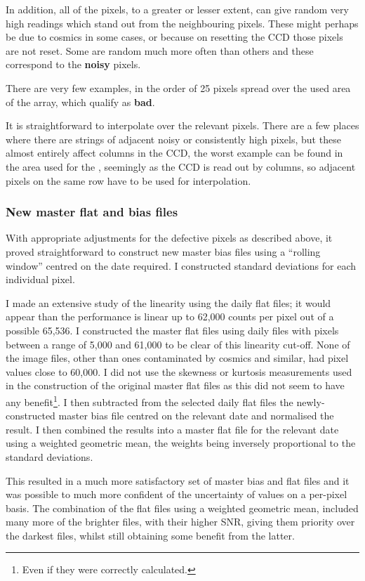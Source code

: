 In addition, all of the pixels, to a greater or lesser extent, can give random
very high readings which stand out from the neighbouring pixels. These might
perhaps be due to cosmics in some cases, or because on resetting the CCD those
pixels are not reset. Some are random much more often than others and these
correspond to the \textbf{noisy} pixels.

There are very few examples, in the order of 25 pixels spread over the used area
of the array, which qualify as \textbf{bad}.

It is straightforward to interpolate over the relevant pixels. There are a few places where there are strings of
adjacent noisy or consistently high pixels, but these almost entirely affect
columns in the CCD, the worst example can be found in the area used for the \gfilter, seemingly as
the CCD is read out by columns, so adjacent pixels on the same row have to be
used for interpolation.

\subsubsection{New master flat and bias files}
\protect\label{section:newmastfb}

With appropriate adjustments for the defective pixels as described above, it
proved straightforward to construct new master bias files using a  ``rolling
window'' centred on the date required. I constructed standard deviations for each individual pixel.

I made an extensive study of the linearity using the daily flat
files; it would  appear than the performance is linear up to 62,000 counts per
pixel out of a possible 65,536. I constructed the master
flat files using daily files with pixels between a range of 5,000 and 61,000 to be clear of this linearity cut-off.
None of the image files, other than ones contaminated by cosmics and similar,
had pixel values close to 60,000. I did not use the skewness or kurtosis
measurements used in the construction of the original master flat files as this
did not seem to have any benefit\footnote{Even if they were correctly
calculated.}. I then subtracted from the selected daily flat files
the newly-constructed master bias file centred on the relevant date and normalised the result.
I then combined the results into a master flat file for the relevant date using a weighted geometric mean,
the weights being inversely proportional to the standard deviations.

This resulted in a much more satisfactory set of master bias and flat files and
it was possible to much more confident of the uncertainty of values on a
per-pixel basis. The combination of the flat files using a weighted
geometric mean, included many more of the brighter files, with their higher
SNR, giving them priority over the darkest files, whilst still obtaining some
benefit from the latter.

